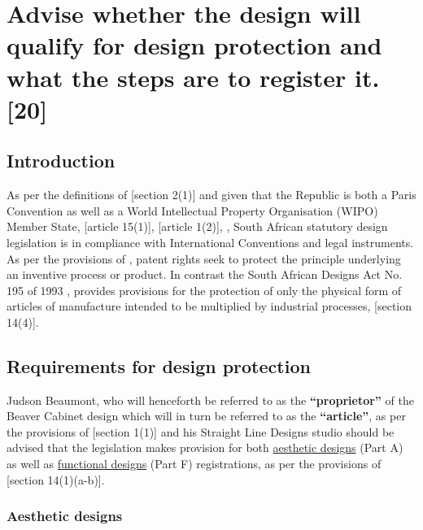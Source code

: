 \documentclass[11pt]{article}
\begin{document}
\section{Advise whether the design will qualify for design protection and what the steps are to register it. [20]}
\label{sec:org7e2e903}

\subsection{Introduction}
\label{sec:org9449bdd}

As per the definitions of [section 2(1)]\cite{rsa93_tm_act} and given that the
Republic is both a Paris Convention as well as a World Intellectual Property
Organisation (WIPO) Member State, [article 15(1)]\cite{wto17_trips}, [article
1(2)]\cite{wipo83_paris_conve_protect_ip}, \cite{wipo25_hague_agreement}, South African statutory design
legislation is in compliance with International Conventions and legal instruments.\\

As per the provisions of \cite{rsa78_patents_act}, patent rights seek to protect
the principle underlying an inventive process or product. In contrast the South
African Designs Act No. 195 of 1993 \cite{rsa93_designs_act}, provides provisions
for the protection of only the physical form of articles of manufacture intended
to be multiplied by industrial processes, [section 14(4)]\cite{rsa93_designs_act}.

\subsection{Requirements for design protection}
\label{sec:orgf372765}

Judson Beaumont, who will henceforth be referred to as the \textbf{``proprietor''} of
the Beaver Cabinet design which will in turn be referred to as the \textbf{``article''}, as
per the provisions of [section 1(1)]\cite{rsa93_designs_act} and his Straight Line
Designs studio should be advised that the legislation makes provision for both
\uline{aesthetic designs} (Part A) as well as \uline{functional designs} (Part F)
registrations, as per the provisions of [section
14(1)(a-b)]\cite{rsa93_designs_act}.

\subsubsection{Aesthetic designs}
\label{sec:orgf221d5e}
\end{document}
